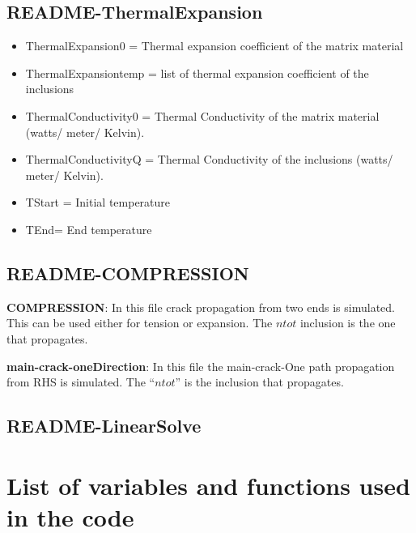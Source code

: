 \documentclass[12pt]{article}
\numberwithin{equation}{subsection}
\begin{document}
\subsection{README-ThermalExpansion}
\begin{itemize}
\item ThermalExpansion0 = Thermal expansion coefficient of the matrix material
\item ThermalExpansiontemp = list of thermal expansion coefficient of the inclusions
\item ThermalConductivity0 = Thermal Conductivity of the matrix material (watts/ meter/ Kelvin).
\item ThermalConductivityQ = Thermal Conductivity of the inclusions (watts/ meter/ Kelvin).
\item TStart = Initial temperature
\item TEnd= End temperature 

\end{itemize}


\clearpage
 \subsection{README-COMPRESSION}
 

\textbf{COMPRESSION}: In this file crack propagation from two ends is simulated. This can be used either for tension or expansion. The $ntot $ inclusion is the one that propagates. 

\textbf{main-crack-oneDirection}: In this file the main-crack-One path propagation from RHS is simulated. The $“ntot”$ is the inclusion that propagates. 

\clearpage
\subsection{README-LinearSolve}

\newpage
\section{List of variables and functions used in the code}
\end{document}

